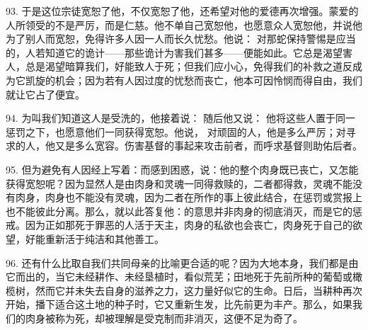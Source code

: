 93. 于是这位宗徒宽恕了他，不仅宽恕了他，还希望对他的爱德再次增强。蒙爱的人所领受的不是严厉，而是仁慈。他不单自己宽恕他，也愿意众人宽恕他，并说他为了别人而宽恕，免得许多人因一人而长久忧愁。他说： 对那蛇保持警惕是应当的，人若知道它的诡计——那些诡计为害我们甚多——便能如此。它总是渴望害人，总是渴望暗算我们，好能致人于死；但我们应小心，免得我们的补救之道反成为它凯旋的机会；因为若有人因过度的忧愁而丧亡，他本可因怜悯而得自由，我们就让它占了便宜。\par

94. 为叫我们知道这人是受洗的，他接着说： 随后他又说： 他将这些人置于同一惩罚之下，也愿意他们一同获得宽恕。他说， 对顽固的人，他是多么严厉；对寻求的人，他又是多么宽容。伤害基督的事起来攻击前者，而呼求基督则助佑后者。\par

95. 但为避免有人因经上写着：而感到困惑，说：他的整个肉身既已丧亡，又怎能获得宽恕呢？因为显然人是由肉身和灵魂一同得救赎的，二者都得救，灵魂不能没有肉身，肉身也不能没有灵魂，因为二者在所作的事上彼此结合，在惩罚或赏报上也不能彼此分离。那么，就以此答复他：的意思并非肉身的彻底消灭，而是它的惩戒。因为正如那死于罪恶的人活于天主，肉身的私欲也会丧亡，肉身死于自己的欲望，好能重新活于纯洁和其他善工。\par

96. 还有什么比取自我们共同母亲的比喻更合适的呢？因为大地本身，我们都是由它而出的，当它未经耕作、未经垦植时，看似荒芜；田地死于先前所种的葡萄或橄榄树，然而它并未失去自身的滋养之力，这力量好似它的生命。日后，当耕种再次开始，播下适合这土地的种子时，它又重新生发，比先前更为丰产。那么，如果我们的肉身被称为死，却被理解是受克制而非消灭，这便不足为奇了。\par


